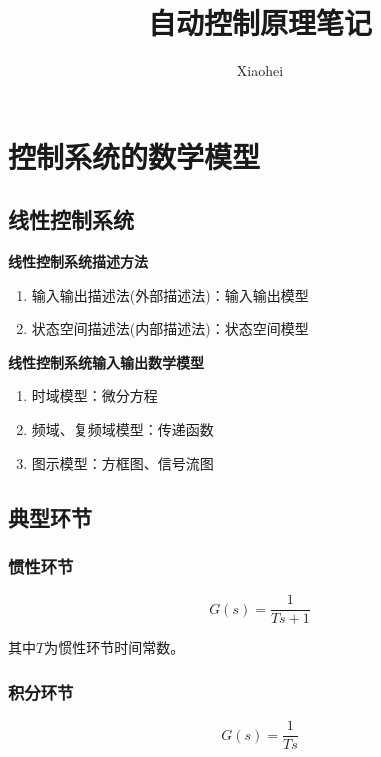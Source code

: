 \documentclass[cn, blue, normal, 12pt]{elegantnote}
\title{自动控制原理笔记}
\author{Xiaohei}
\institute{Created by Elegant\LaTeX{}}
\date{\zhtoday}
\begin{document}
\maketitle

\section{控制系统的数学模型}

\subsection{线性控制系统}

\textbf{线性控制系统描述方法}

\begin{enumerate}
    \item 输入输出描述法(外部描述法)：输入输出模型
    \item 状态空间描述法(内部描述法)：状态空间模型
\end{enumerate}

\textbf{线性控制系统输入输出数学模型}

\begin{enumerate}
    \item 时域模型：微分方程
    \item 频域、复频域模型：传递函数
    \item 图示模型：方框图、信号流图
\end{enumerate}

\subsection{典型环节}

\subsubsection{惯性环节}

\begin{equation}
    G(s)=\frac{1}{Ts+1}
\end{equation}

其中$T$为惯性环节时间常数。

\subsubsection{积分环节}

\begin{equation}
    G(s)=\frac{1}{Ts}
\end{equation}
\end{document}
